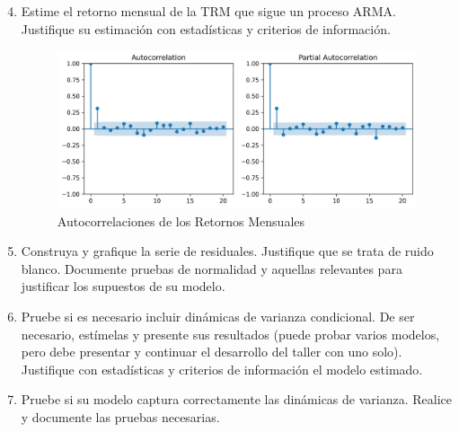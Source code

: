 \documentclass{article}
\theoremstyle{remark}
\theoremstyle{definition}
\begin{document}
\begin{enumerate}[label = \emph{\alph*})]\setcounter{enumi}{3}
    \item {Estime el retorno mensual de la TRM que sigue un proceso ARMA. Justifique su estimaci\'on con estad\'isticas y criterios de informaci\'on.}
        \begin{tcolorbox}[title=Soluci\'on 2.d]
            
            \begin{figure}[H]
                \centering
                \includegraphics[width=0.9\linewidth]{output/acf_pacf_retornos.png}
                \caption{Autocorrelaciones de los Retornos Mensuales}
                \label{fig:retorno}
            \end{figure}
            
            
        \end{tcolorbox}
    \item {Construya y grafique la serie de residuales. Justifique que se trata de ruido blanco. Documente pruebas de normalidad y aquellas relevantes para justificar los supuestos de su modelo.}
        \begin{tcolorbox}[title=Soluci\'on 2.e]
            
        \end{tcolorbox}
    \item {Pruebe si es necesario incluir din\'amicas de varianza condicional. De ser necesario, est\'imelas y presente sus resultados (puede probar varios modelos, pero debe presentar y continuar el desarrollo del taller con uno solo). Justifique con estad\'isticas y criterios de informaci\'on el modelo estimado.}
        \begin{tcolorbox}[title=Soluci\'on 2.f]
            
        \end{tcolorbox}
    \item {Pruebe si su modelo captura correctamente las din\'amicas de varianza. Realice y documente las pruebas necesarias.}
        \begin{tcolorbox}[title=Soluci\'on 2.g]
            
        \end{tcolorbox}
\end{enumerate}
\end{document}
